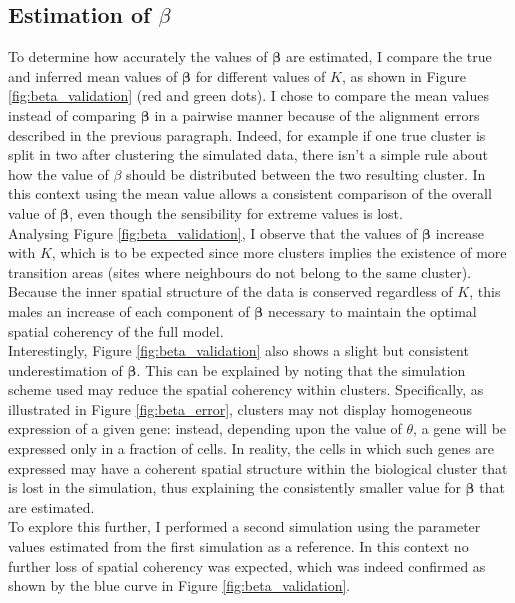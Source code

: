 	\subsection{Estimation of $\beta$}\label{subsec:beta_estimation}
	To determine how accurately the values of $\boldsymbol{\beta}$ are estimated, I compare the true and inferred mean values of $\boldsymbol{\beta}$ for different values of $K$, as shown in Figure \ref{fig:beta_validation} (red and green dots). I chose to compare the mean values instead of comparing $\boldsymbol{\beta}$ in a pairwise manner because of the alignment errors described in the previous paragraph. Indeed, for example if one true cluster is split in two after clustering the simulated data, there isn't a simple rule about how the value of $\beta$ should be distributed between the two resulting cluster. In this context using the mean value allows a consistent comparison of the overall value of $\boldsymbol{\beta}$, even though the sensibility for extreme values is lost.\\

	 Analysing Figure \ref{fig:beta_validation}, I observe that the values of $\boldsymbol{\beta}$ increase with $K$, which is to be expected since more clusters implies the existence of more transition areas (sites where neighbours do not belong to the same cluster). Because the inner spatial structure of the data is conserved regardless of $K$, this males an increase of each component of $\boldsymbol{\beta}$ necessary to maintain the optimal spatial coherency of the full model.\\
	
	Interestingly, Figure \ref{fig:beta_validation} also shows a slight but consistent underestimation of $\boldsymbol{\beta}$. This can be explained by noting that the simulation scheme used may reduce the spatial coherency within clusters. Specifically, as illustrated in Figure \ref{fig:beta_error}, clusters may not display homogeneous expression of a given gene: instead, depending upon the value of $\theta$, a gene will be expressed only in a fraction of cells. In reality, the cells in which such genes are expressed may have a coherent spatial structure within the biological cluster that is lost in the simulation, thus explaining the consistently smaller value for $\boldsymbol{\beta}$ that are estimated.\\
	
	 To explore this further, I performed a second simulation using the parameter values estimated from the first simulation as a reference. In this context no further loss of spatial coherency was expected, which was indeed confirmed as shown by the blue curve in Figure \ref{fig:beta_validation}.\\
	
